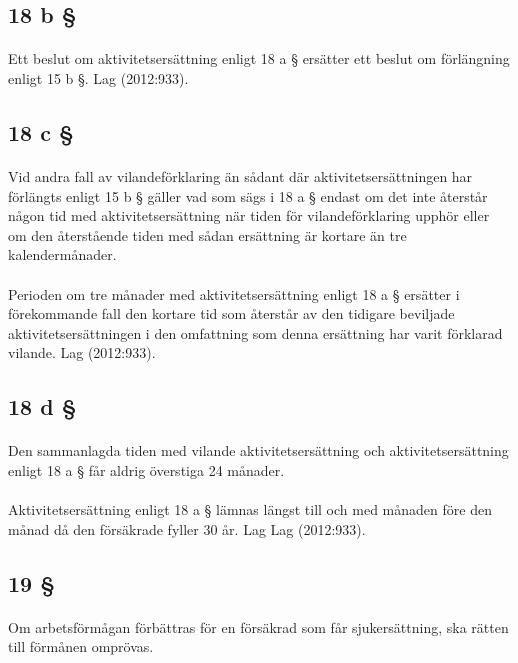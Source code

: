 \documentclass[a4paper,notitlepage,openany,10pt]{book}
\begin{document}
\subsection*{18 b §}
\paragraph*{}
Ett beslut om aktivitetsersättning enligt 18 a § ersätter ett beslut om förlängning enligt 15 b §.
Lag (2012:933).
\subsection*{18 c §}
\paragraph*{}
Vid andra fall av vilandeförklaring än sådant där aktivitetsersättningen har förlängts enligt 15 b § gäller vad som sägs i 18 a § endast om det inte återstår någon tid med aktivitetsersättning när tiden för vilandeförklaring upphör eller om den återstående tiden med sådan ersättning är kortare än tre kalendermånader.
\paragraph*{}
Perioden om tre månader med aktivitetsersättning enligt 18 a § ersätter i förekommande fall den kortare tid som återstår av den tidigare beviljade aktivitetsersättningen i den omfattning som denna ersättning har varit förklarad vilande.
Lag (2012:933).
\subsection*{18 d §}
\paragraph*{}
Den sammanlagda tiden med vilande aktivitetsersättning och aktivitetsersättning enligt 18 a § får aldrig överstiga 24 månader.
\paragraph*{}
Aktivitetsersättning enligt 18 a § lämnas längst till och med månaden före den månad då den försäkrade fyller 30 år.
Lag
Lag (2012:933).
\subsection*{19 §}
\paragraph*{}
Om arbetsförmågan förbättras för en försäkrad som får sjukersättning, ska rätten till förmånen omprövas.
\end{document}
